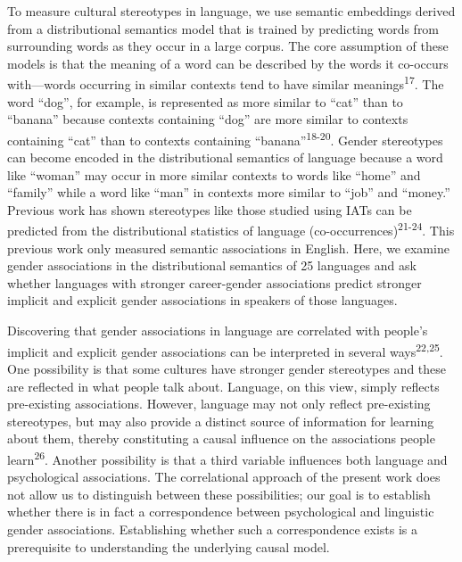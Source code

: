 \documentclass[11pt]{wlscirep}
\begin{document}
To measure cultural stereotypes in language, we use semantic embeddings derived from a distributional semantics model that is trained by predicting words from surrounding words as they occur in a large corpus. The core assumption of these models is that the meaning of a word can be described by the words it co-occurs with---words occurring in similar contexts tend to have similar meanings\textsuperscript{17}. The word \enquote{dog}, for example, is represented as more similar to \enquote{cat} than to \enquote{banana} because contexts containing \enquote{dog} are more similar to contexts containing \enquote{cat} than to contexts containing \enquote{banana}\textsuperscript{18-20}. Gender stereotypes can become encoded in the distributional semantics of language because a word like \enquote{woman} may occur in more similar contexts to words like \enquote{home} and \enquote{family} while a word like \enquote{man} in contexts more similar to \enquote{job} and \enquote{money.} Previous work has shown stereotypes like those studied using IATs can be predicted from the distributional statistics of language (co-occurrences)\textsuperscript{21-24}. This previous work only measured semantic associations in English. Here, we examine gender associations in the distributional semantics of 25 languages and ask whether languages with stronger career-gender associations predict stronger implicit and explicit gender associations in speakers of those languages.

Discovering that gender associations in language are correlated with people’s implicit and explicit gender associations can be interpreted in several ways\textsuperscript{22,25}.  One possibility is that some cultures have stronger gender stereotypes and these are reflected in what people talk about. Language, on this view, simply reflects pre-existing associations. However, language may not only reflect pre-existing stereotypes, but may also provide a distinct source of information for
learning about them, thereby constituting a causal influence on the associations people learn\textsuperscript{26}. Another possibility is that a third variable influences both language and psychological associations. The correlational approach of the present work does not allow us to distinguish between these possibilities; our  goal is to establish whether there is in fact a correspondence between psychological and linguistic gender associations. Establishing whether such a correspondence exists is a prerequisite to understanding the underlying causal model.
\end{document}

